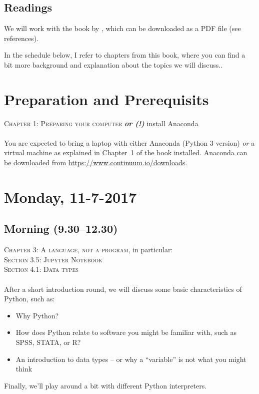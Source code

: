 \documentclass[a4paper,12pt]{report}
\begin{document}
\subsection*{Readings}
We will work with the book by \cite{Trilling2016}, which can be downloaded as a PDF file (see references).


In the schedule below, I refer to chapters from this book, where you can find a bit more background and explanation about the topics we will discuss..


\section*{Preparation and Prerequisits}
\textsc{ Chapter 1: Preparing your computer} \textbf{\emph{or (!)}} install Anaconda\\
~\\
You are expected to bring a laptop with either Anaconda (Python 3 version) \emph{or} a virtual machine as explained in Chapter~1 of the book installed. Anaconda can be downloaded from  \url{https://www.continuum.io/downloads}.










\section*{Monday, 11-7-2017}
\subsection*{Morning (9.30--12.30)}
\textsc{ Chapter 3: A language, not a program}, in particular: \\ \textsc{ Section 3.5: Jupyter Notebook} \\
\textsc{ Section 4.1: Data types} \\
~\\
After a short introduction round, we will discuss some basic characteristics of Python, such as:
\begin{itemize}
	\item Why Python?
	\item How does Python relate to software you might be familiar with, such as SPSS, STATA, or R?
	\item An introduction to data types -- or why a ``variable'' is not what you might think
\end{itemize}
Finally, we'll play around a bit with different Python interpreters.
\end{document}
